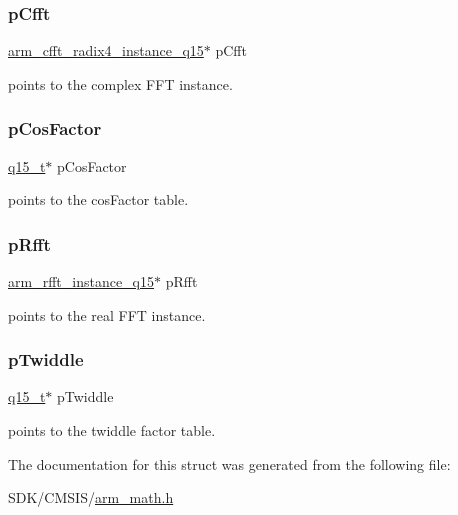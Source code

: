 \subsubsection{\texorpdfstring{p\+Cfft}{pCfft}}
{\footnotesize\ttfamily \mbox{\hyperlink{structarm__cfft__radix4__instance__q15}{arm\+\_\+cfft\+\_\+radix4\+\_\+instance\+\_\+q15}}$\ast$ p\+Cfft}

points to the complex F\+FT instance. \mbox{\label{structarm__dct4__instance__q15_a9d858d313cbba67ceaef9704bc9c43b0}} 
\subsubsection{\texorpdfstring{p\+Cos\+Factor}{pCosFactor}}
{\footnotesize\ttfamily \mbox{\hyperlink{arm__math_8h_ab5a8fb21a5b3b983d5f54f31614052ea}{q15\+\_\+t}}$\ast$ p\+Cos\+Factor}

points to the cos\+Factor table. \mbox{\label{structarm__dct4__instance__q15_aea6aa42c838f2b22c8c31e9e259b8d75}} 
\subsubsection{\texorpdfstring{p\+Rfft}{pRfft}}
{\footnotesize\ttfamily \mbox{\hyperlink{structarm__rfft__instance__q15}{arm\+\_\+rfft\+\_\+instance\+\_\+q15}}$\ast$ p\+Rfft}

points to the real F\+FT instance. \mbox{\label{structarm__dct4__instance__q15_aa8c837c05b2c910342ab8f171d30dc02}} 
\subsubsection{\texorpdfstring{p\+Twiddle}{pTwiddle}}
{\footnotesize\ttfamily \mbox{\hyperlink{arm__math_8h_ab5a8fb21a5b3b983d5f54f31614052ea}{q15\+\_\+t}}$\ast$ p\+Twiddle}

points to the twiddle factor table. 

The documentation for this struct was generated from the following file\+:\begin{DoxyCompactItemize}
\item 
S\+D\+K/\+C\+M\+S\+I\+S/\mbox{\hyperlink{arm__math_8h}{arm\+\_\+math.\+h}}\end{DoxyCompactItemize}
